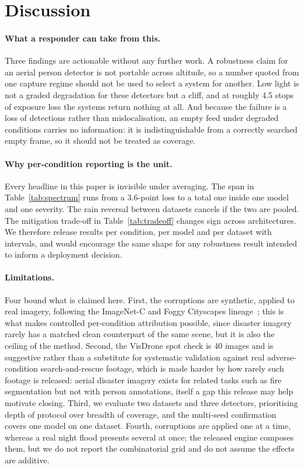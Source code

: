 \section{Discussion}
\label{sec:discussion}

\paragraph{What a responder can take from this.} Three findings are
actionable without any further work. A robustness claim for an aerial
person detector is not portable across altitude, so a number quoted from
one capture regime should not be used to select a system for another.
Low light is not a graded degradation for these detectors but a cliff,
and at roughly 4.5 stops of exposure loss the systems return nothing at
all. And because the failure is a loss of detections rather than
mislocalisation, an empty feed under degraded conditions carries no
information: it is indistinguishable from a correctly searched empty
frame, so it should not be treated as coverage.

\paragraph{Why per-condition reporting is the unit.} Every headline in
this paper is invisible under averaging. The span in
Table~\ref{tab:spectrum} runs from a 3.6-point loss to a total one
inside one model and one severity. The rain reversal between datasets
cancels if the two are pooled. The mitigation trade-off in
Table~\ref{tab:tradeoff} changes sign across architectures. We therefore
release results per condition, per model and per dataset with intervals,
and would encourage the same shape for any robustness result intended to
inform a deployment decision.

\paragraph{Limitations.} Four bound what is claimed here. First, the
corruptions are synthetic, applied to real imagery, following the
ImageNet-C and Foggy Cityscapes
lineage~\cite{hendrycks2019imagenetc,sakaridis2018foggy}; this is what
makes controlled per-condition attribution possible, since disaster
imagery rarely has a matched clean counterpart of the same scene, but it
is also the ceiling of the method. Second, the VisDrone spot check is
40 images and is suggestive rather than a substitute for systematic
validation against real adverse-condition search-and-rescue footage,
which is made harder by how rarely such footage is released: aerial
disaster imagery exists for related tasks such as fire segmentation but
not with person annotations, itself a gap this release may help motivate
closing. Third, we evaluate two datasets and three detectors,
prioritising depth of protocol over breadth of coverage, and the
multi-seed confirmation covers one model on one dataset. Fourth,
corruptions are applied one at a time, whereas a real night flood
presents several at once; the released engine composes them, but we do
not report the combinatorial grid and do not assume the effects are
additive.

